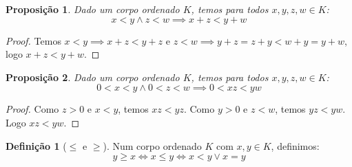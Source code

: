\documentclass{article}
\newtheorem{prop}{Proposição}[section]
\theoremstyle{theorem}
\theoremstyle{lemma}
\theoremstyle{definition}
\newtheorem{definicao}{Definição}[section]
\theoremstyle{remark}
\begin{document}
\begin{prop}
	Dado um corpo ordenado $K$, temos para todos $x,y,z,w\in K$:
	$$ x<y \land z<w \implies x+z < y+w$$
\end{prop}
\begin{proof}
	Temos $x < y \implies x+z < y+z$ e $z<w \implies y+z = z+y < w+y = y +w$, logo $x+z < y+w$.
\end{proof}
\begin{prop}
	Dado um corpo ordenado $K$, temos para todos $x,y,z,w\in K$:
	$$ 0 < x<y \land 0<z<w \implies 0 < xz < yw$$
\end{prop}
\begin{proof}
	Como $z>0$  e $x<y$, temos $xz<yz$. Como $y>0$  e $z<w$, temos $yz < yw$. Logo $xz<yw$.
\end{proof}

\begin{definicao}[$\leq$ e $\geq$]
	Num corpo ordenado $K$ com $x,y \in K$, definimos:
	$$ y \geq x \iff  x\leq y \iff  x<y \lor x = y$$
\end{definicao}
\end{document}
